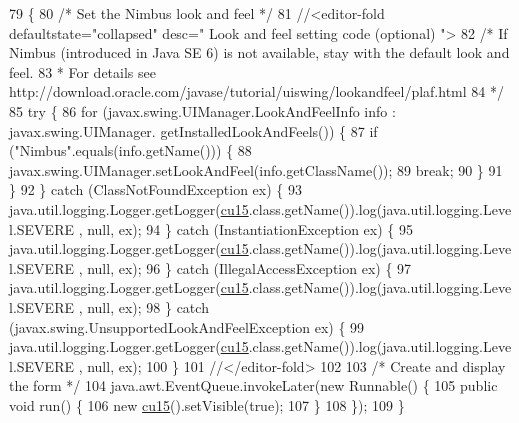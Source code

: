 \begin{DoxyCode}
79                                            \{
80         \textcolor{comment}{/* Set the Nimbus look and feel */}
81         \textcolor{comment}{//<editor-fold defaultstate="collapsed" desc=" Look and feel setting code (optional) ">}
82         \textcolor{comment}{/* If Nimbus (introduced in Java SE 6) is not available, stay with the default look and feel.}
83 \textcolor{comment}{         * For details see http://download.oracle.com/javase/tutorial/uiswing/lookandfeel/plaf.html }
84 \textcolor{comment}{         */}
85         \textcolor{keywordflow}{try} \{
86             \textcolor{keywordflow}{for} (javax.swing.UIManager.LookAndFeelInfo info : javax.swing.UIManager.
      getInstalledLookAndFeels()) \{
87                 \textcolor{keywordflow}{if} (\textcolor{stringliteral}{"Nimbus"}.equals(info.getName())) \{
88                     javax.swing.UIManager.setLookAndFeel(info.getClassName());
89                     \textcolor{keywordflow}{break};
90                 \}
91             \}
92         \} \textcolor{keywordflow}{catch} (ClassNotFoundException ex) \{
93             java.util.logging.Logger.getLogger(\mbox{\hyperlink{classinterfacessoguar_1_1cu15_ad7d9907f41ebfa566258331685fb979d}{cu15}}.class.getName()).log(java.util.logging.Level.SEVERE
      , null, ex);
94         \} \textcolor{keywordflow}{catch} (InstantiationException ex) \{
95             java.util.logging.Logger.getLogger(\mbox{\hyperlink{classinterfacessoguar_1_1cu15_ad7d9907f41ebfa566258331685fb979d}{cu15}}.class.getName()).log(java.util.logging.Level.SEVERE
      , null, ex);
96         \} \textcolor{keywordflow}{catch} (IllegalAccessException ex) \{
97             java.util.logging.Logger.getLogger(\mbox{\hyperlink{classinterfacessoguar_1_1cu15_ad7d9907f41ebfa566258331685fb979d}{cu15}}.class.getName()).log(java.util.logging.Level.SEVERE
      , null, ex);
98         \} \textcolor{keywordflow}{catch} (javax.swing.UnsupportedLookAndFeelException ex) \{
99             java.util.logging.Logger.getLogger(\mbox{\hyperlink{classinterfacessoguar_1_1cu15_ad7d9907f41ebfa566258331685fb979d}{cu15}}.class.getName()).log(java.util.logging.Level.SEVERE
      , null, ex);
100         \}
101         \textcolor{comment}{//</editor-fold>}
102 
103         \textcolor{comment}{/* Create and display the form */}
104         java.awt.EventQueue.invokeLater(\textcolor{keyword}{new} Runnable() \{
105             \textcolor{keyword}{public} \textcolor{keywordtype}{void} run() \{
106                 \textcolor{keyword}{new} \mbox{\hyperlink{classinterfacessoguar_1_1cu15_ad7d9907f41ebfa566258331685fb979d}{cu15}}().setVisible(\textcolor{keyword}{true});
107             \}
108         \});
109     \}
\end{DoxyCode}


